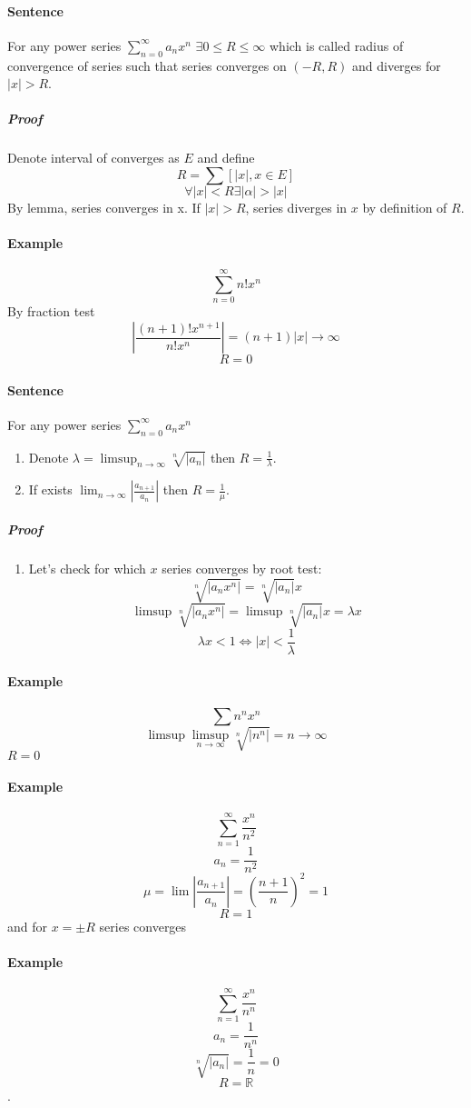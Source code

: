 \paragraph{Sentence}
For any power series $\sum_{n=0}^\infty a_n x^n$ $\exists 0\leq R\leq \infty$ which is called radius of convergence of series such that series converges on $(-R, R)$ and diverges for $|x| > R$.
\subparagraph{Proof}
Denote interval of converges as $E$ and define
$$R = \sum \left[ |x|, x \in E \right]$$
$$\forall |x| < R \exists |\alpha| > |x|$$
By lemma, series converges in x. If $|x| > R$, series diverges in $x$ by definition of $R$.
\paragraph{Example}
$$\sum_{n=0}^\infty n!x^n$$
By fraction test
$$\left| \frac{(n+1)!x^{n+1}}{n!x^n}\right| = (n+1)|x| \to \infty$$
$$R=0$$
\paragraph{Sentence}
For any power series $\sum_{n=0}^\infty a_n x^n$
\begin{enumerate}
	\item Denote $\lambda = \limsup_{n \to \infty} \sqrt[n]{|a_n|}$ then $R = \frac{1}{\lambda}$.
	\item If exists $\lim_{n \to \infty} \left| \frac{a_{n+1}}{a_n} \right|$ then $R = \frac{1}{\mu}$.
\end{enumerate}
\subparagraph{Proof}
\begin{enumerate}
	\item Let's check for which $x$ series converges by root test: 
	$$\sqrt[n]{|a_n x^n|} = \sqrt[n]{|a_n |}x$$
	$$\limsup \sqrt[n]{|a_n x^n|}  = \limsup \sqrt[n]{|a_n |}x = \lambda x$$
	$$\lambda x < 1 \iff |x| < \frac{1}{\lambda}$$
\end{enumerate}
\paragraph{Example}
$$\sum n^n x^n$$
$$\limsup  \limsup_{n \to \infty} \sqrt[n]{|n^n|} = n \to \infty$$
$R=0$
\paragraph{Example}
$$\sum_{n=1}^{\infty} \frac{x^n}{n^2}$$
$$a_n = \frac{1}{n^2}$$
$$\mu = \lim \left|\frac{a_{n+1}}{a_n}\right| = \left(\frac{n+1}{n}\right)^2 = 1$$
$$R = 1$$
and for $x=\pm R$ series converges
\paragraph{Example}
$$\sum_{n=1}^{\infty} \frac{x^n}{n^n}$$
$$a_n =\frac{1}{n^n}$$
$$\sqrt[n]{|a_n|} = \frac{1}{n} = 0$$
$$R=\mathbb{R}$$.
